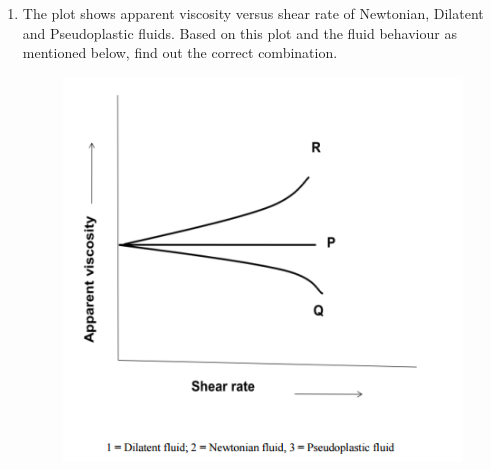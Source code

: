 \documentclass[a4paper,10pt]{article}
\begin{document}
\begin{enumerate}
    \item The plot shows apparent viscosity versus shear rate of Newtonian, Dilatent and Pseudoplastic fluids. Based on this plot and the fluid behaviour as mentioned below, find out the correct combination.
    \begin{figure}[H] \centering \includegraphics[width=0.6\columnwidth]{q16_poly_2018.png} \caption*{} \label{fig:q16_poly_2018} \end{figure}
    \hfill{}
    \begin{enumerate}[label=\Alph*)]
    \end{enumerate}


\end{enumerate}
\end{document}
